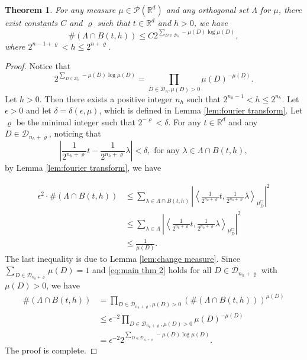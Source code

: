 \documentclass[12pt,a4paper,intlimits,sumlimits]{amsart}
\theoremstyle{plain}
\newtheorem{theorem}{Theorem}
\theoremstyle{definition}
\newcounter{rem}
\begin{document}
\begin{theorem}\label{thm:estimation}
   For any   measure $\mu  \in \mathcal{P}(\mathbb{R}^d)$  and   any orthogonal set $\Lambda$ for $\mu$, there exist constants $C$ and $\varrho$  such that  $t\in \mathbb{R}^d$ and $h>0$, we have
    \begin{equation}
	\# (\Lambda\cap B(t, h))
	 \le  C 2^{\sum_{D\in \mathcal{D}_n} -\mu(D)\log \mu(D)},
	 \end{equation}
     where $2^{n-1+\varrho}<h\le 2^{n+\varrho}$.
\end{theorem}
\begin{proof}
	 Notice that
	 \begin{equation}\label{eq:main thm 1}
	 2^{\sum_{D\in \mathcal{D}_n} -\mu(D)\log \mu(D)}=\prod_{D\in \mathcal{D}_n, \mu(D)>0} \mu(D)^{-\mu(D)}.
	 \end{equation}
	 Let $h>0$. Then there exists a positive integer $n_h$ such that $2^{n_h-1}< h\le 2^{n_h}$. Let $\epsilon>0$ and let $\delta=\delta(\epsilon, \mu)$, which is defined in Lemma \ref{lem:fourier transform}. Let $\varrho$ be the minimal integer such that $2^{-\varrho}<\delta$. For any $t\in \mathbb{R}^d$ and any $D\in \mathcal{D}_{n_h+\varrho}$, noticing that 
     $$
     \left|\frac{1}{2^{n_h+\varrho}}t-\frac{1}{2^{n_h+\varrho}}\lambda\right|<\delta, \text{ for any } \lambda\in \Lambda\cap B(t, h),
     $$
     by Lemma \ref{lem:fourier transform}, we have

\begin{equation}\label{eq:main thm 2}
	 \begin{split}
	 \epsilon^2 \cdot \#(\Lambda\cap B(t, h))
	 &\le \sum_{\lambda\in \Lambda\cap B(t, h)} \left|\left\langle \frac{1}{2^{n_h+\varrho}}t, \frac{1}{2^{n_h+\varrho}}\lambda \right\rangle_{\mu_{D}^{\Box}}  \right|^2\\
	 &\le \sum_{\lambda\in \Lambda} \left|\left\langle \frac{1}{2^{n_h+\varrho}}t, \frac{1}{2^{n_h+\varrho}}\lambda \right\rangle_{\mu_{D}^{\Box}}  \right|^2\\
 &\le \frac{1}{\mu({D})}.
	 \end{split}
	 \end{equation}
     The last inequality is due to   Lemma \ref{lem:change measure}. Since $\sum_{D\in \mathcal{D}_{n_h+\varrho}}\mu(D)=1$ and \eqref{eq:main thm 2} holds for all $D\in \mathcal{D}_{n_h+\varrho}$ with $\mu(D)>0$, we have
	 \begin{equation}\label{eq:main thm 3}
	 \begin{split}
\# (\Lambda\cap B(t, h))
	 &=\prod_{D\in \mathcal{D}_{n_h+\varrho}, \mu(D)>0}(\# (\Lambda\cap B(t, h)))^{\mu(D)} \\
	 &\le  \epsilon^{-2} \prod_{D\in \mathcal{D}_{n_h+\varrho}, \mu(D)>0} \mu(D)^{-\mu(D)}\\
  &=\epsilon^{-2} 2^{\sum_{D\in \mathcal{D}_{n_h+\varrho}} -\mu(D)\log \mu(D)}.
	 \end{split}
	 \end{equation}
	 The proof is complete.
     
\end{proof}
\end{document}
